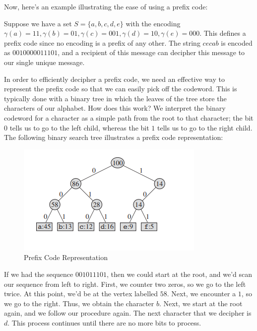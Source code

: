 Now, here's an example illustrating the ease of using a prefix code:

\begin{example}
 Suppose we have a set $S = \{a, b, c, d, e\}$ with the encoding $\gamma(a) = 11, \gamma(b) = 01, \gamma(c) = 001, \gamma(d) = 10, \gamma(e) = 000$. This defines a prefix code since no encoding is a prefix of any other. The string $cecab$ is encoded as $0010000011101$, and a recipient of this message can decipher this message to our single unique message.
\end{example}

In order to efficiently decipher a prefix code, we need an effective way to represent the prefix code so that we can easily pick off the codeword. This is typically done with a binary tree in which the leaves of the tree store the characters of our alphabet. How does this work? We interpret the binary codeword for a character as a simple path from the root to that character; the bit $0$ tells us to go to the left child, whereas the bit $1$ tells us to go to the right child. \\

The following binary search tree illustrates a prefix code representation:

\begin{figure}[h]
\centering
\includegraphics[scale=1]{media/prefix}
\caption{Prefix Code Representation}
\end{figure}

If we had the sequence $001011101$, then we could start at the root, and we'd scan our sequence from left to right. First, we counter two zeros, so we go to the left twice. At this point, we'd be at the vertex labelled $58$. Next, we encounter a $1$, so we go to the right. Thus, we obtain the character $b$. Next, we start at the root again, and we follow our procedure again. The next character that we decipher is $d$. This process continues until there are no more bits to process. \\


